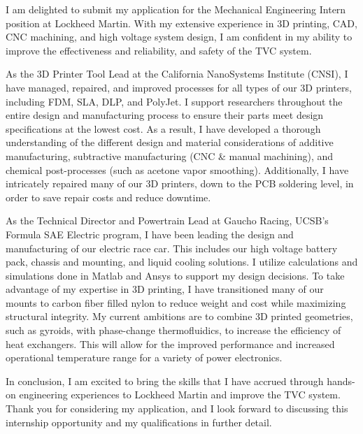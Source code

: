 \documentclass[11pt, letterpaper]{awesome-cv} %
\begin{document}
\makecvheader %

\makelettertitle %


\begin{cvletter}


I am delighted to submit my application for the Mechanical Engineering Intern position at Lockheed Martin. With my extensive experience in 3D printing, CAD, CNC machining, and high voltage system design, I am confident in my ability to improve the effectiveness and reliability, and safety of the TVC system.

As the 3D Printer Tool Lead at the California NanoSystems Institute (CNSI), I have managed, repaired, and improved processes for all types of our 3D printers, including FDM, SLA, DLP, and PolyJet. I support researchers throughout the entire design and manufacturing process to ensure their parts meet design specifications at the lowest cost. As a result, I have developed a thorough understanding of the different design and material considerations of additive manufacturing, subtractive manufacturing (CNC \& manual machining), and chemical post-processes (such as acetone vapor smoothing). Additionally, I have intricately repaired many of our 3D printers, down to the PCB soldering level, in order to save repair costs and reduce downtime.

As the Technical Director and Powertrain Lead at Gaucho Racing, UCSB's Formula SAE Electric program, I have been leading the design and manufacturing of our electric race car. This includes our high voltage battery pack, chassis and mounting, and liquid cooling solutions. I utilize calculations and simulations done in Matlab and Ansys to support my design decisions. To take advantage of my expertise in 3D printing, I have transitioned many of our mounts to carbon fiber filled nylon to reduce weight and cost while maximizing structural integrity. My current ambitions are to combine 3D printed geometries, such as gyroids, with phase-change thermofluidics, to increase the efficiency of heat exchangers. This will allow for the improved performance and increased operational temperature range for a variety of power electronics.

In conclusion, I am excited to bring the skills that I have accrued through hands-on engineering experiences to Lockheed Martin and improve the TVC system. Thank you for considering my application, and I look forward to discussing this internship opportunity and my qualifications in further detail.


\end{cvletter}


\makeletterclosing %
\end{document}

